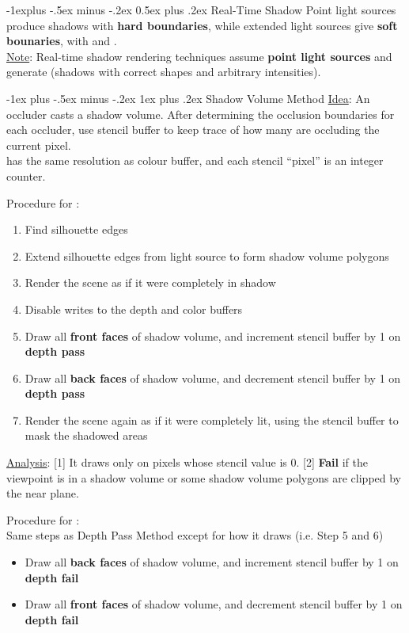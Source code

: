 \documentclass[10pt,landscape,letterpaper]{article}
\makeatletter
\renewcommand{\subsection}{\@startsection{subsection}{2}{0mm}%
                                {-1explus -.5ex minus -.2ex}%
                                {0.5ex plus .2ex}%
                                {\sffamily\normalsize\itshape}}
\renewcommand{\subsubsection}{\@startsection{subsubsection}{3}{0mm}%
                                {-1ex plus -.5ex minus -.2ex}%
                                {1ex plus .2ex}%
                                {\normalfont\small\itshape}}
\makeatother
\begin{document}
\begin{multicols}{3}
\subsection{Real-Time Shadow}
Point light sources produce shadows with \textbf{hard boundaries}, while extended light sources give \textbf{soft bounaries}, with  and .
\\
\underline{Note}: Real-time shadow rendering techniques assume \textbf{point light sources} and generate  (shadows with correct shapes and arbitrary intensities).

\subsubsection{Shadow Volume Method}
\underline{Idea}: An occluder casts a shadow volume. After determining the occlusion boundaries for each occluder, use stencil buffer to keep trace of how many are occluding the current pixel.
\\
 has the same resolution as colour buffer, and each stencil “pixel” is an integer counter.

\smallskip

Procedure for :
\begin{enumerate}
	\item Find silhouette edges
	\item Extend silhouette edges from light source to form shadow volume polygons
	\item Render the scene as if it were completely in shadow
	\item Disable writes to the depth and color buffers
	\item Draw all \textbf{front faces} of shadow volume, and increment stencil buffer by 1 on \textbf{depth pass}
	\item Draw all \textbf{back faces} of shadow volume, and decrement stencil buffer by 1 on \textbf{depth pass}
	\item Render the scene again as if it were completely lit, using the stencil buffer to mask the shadowed areas
\end{enumerate}
\underline{Analysis}: [1] It draws only on pixels whose stencil value is 0. [2] \textbf{Fail} if the viewpoint is in a shadow volume or some shadow volume polygons are clipped by the near plane.

\smallskip

Procedure for :
\\
Same steps as Depth Pass Method except for how it draws (i.e. Step 5 and 6)
\begin{itemize}
	\item Draw all \textbf{back faces} of shadow volume, and increment stencil buffer by 1 on \textbf{depth fail}
	\item Draw all \textbf{front faces} of shadow volume, and decrement stencil buffer by 1 on \textbf{depth fail}
\end{itemize} 



\end{multicols}
\end{document}
